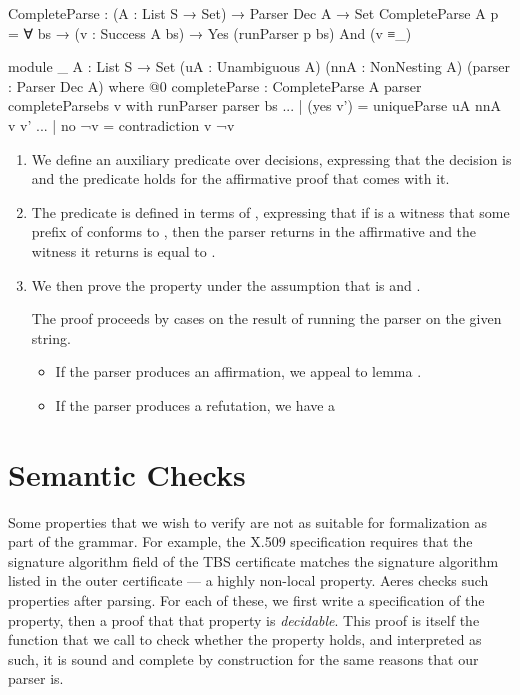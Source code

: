 \documentclass[11pt]{article}
\begin{document}
\begin{AgdaAlign}
\begin{code}
  CompleteParse : (A : List S → Set) → Parser Dec A → Set
  CompleteParse A p =
    ∀ {bs} → (v : Success A bs) → Yes (runParser p bs) And (v ≡_)

  module _ {A : List S → Set}
    (uA : Unambiguous A) (nnA : NonNesting A) (parser : Parser Dec A)
    where
    @0 completeParse : CompleteParse A parser
    completeParse{bs} v
      with runParser parser bs
    ... | (yes v')  = uniqueParse uA nnA v v'
    ... | no ¬v     = contradiction v ¬v
  \end{code}
  \end{AgdaAlign}

\begin{enumerate}
\item We define an auxiliary predicate  over decisions,
expressing that the decision is  and
the predicate  holds for the affirmative proof that comes with
it.
\item The predicate  is defined in terms of
, expressing that if  is a witness that
some prefix of  conforms to , then the parser
returns in the affirmative and the witness it returns is equal to
.

\item We then prove the property  under the
assumption that  is  and
.

The proof proceeds by cases on the result of running the parser on the
given string.
\begin{itemize}
\item If the parser produces an affirmation, we appeal to lemma
.
\item If the parser produces a refutation, we have a
\end{itemize}
\end{enumerate}


\section{Semantic Checks}
\label{sec:orgcf94a3f}

Some properties that we wish to verify are not as suitable for formalization
as part of the grammar.
For example, the X.509 specification requires that the signature algorithm
field of the TBS certificate matches the signature algorithm listed in the
outer certificate --- a highly non-local property.
Aeres checks such properties after parsing.
For each of these, we first write a specification of the property, then a
proof that that property is \emph{decidable}.
This proof is itself the function that we call to check whether the property
holds, and interpreted as such, it is sound and complete by construction for
the same reasons that our parser is.
\end{document}
